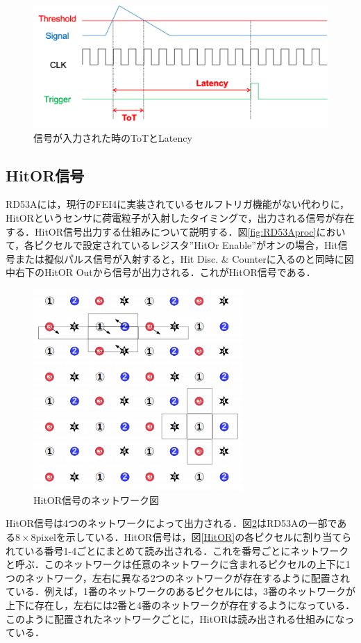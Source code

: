 \begin{figure}[h]
  \centering
  \includegraphics[width=13cm]{./figure/tot.png}
  \caption{信号が入力された時のToTとLatency}
  \label{fig:tot}
\end{figure}



\subsection{HitOR信号}
RD53Aには，現行のFEI4に実装されているセルフトリガ機能がない代わりに，HitORというセンサに荷電粒子が入射したタイミングで，出力される信号が存在する．HitOR信号出力する仕組みについて説明する．図\ref{fig:RD53Aproc}において，各ピクセルで設定されているレジスタ''HitOr Enable''がオンの場合，Hit信号または擬似パルス信号が入射すると，Hit Disc. \& Counterに入るのと同時に図中右下のHitOR Outから信号が出力される．これがHitOR信号である．\par

\begin{figure}[h]
  \centering
  \includegraphics[width=8cm]{./figure/HitOR.png}
  \caption{HitOR信号のネットワーク図}
  \label{fig:HitOR}
\end{figure}

HitOR信号は4つのネットワークによって出力される．図\ref{fig:HitOR}はRD53Aの一部である$8 \times 8 \mathrm{pixel}$を示している．HitOR信号は，図\ref{HitOR}の各ピクセルに割り当てられている番号1-4ごとにまとめて読み出される．これを番号ごとにネットワークと呼ぶ．このネットワークは任意のネットワークに含まれるピクセルの上下に1つのネットワーク，左右に異なる2つのネットワークが存在するように配置されている．例えば，1番のネットワークのあるピクセルには，3番のネットワークが上下に存在し，左右には2番と4番のネットワークが存在するようになっている．このように配置されたネットワークごとに，HitORは読み出される仕組みになっている．

